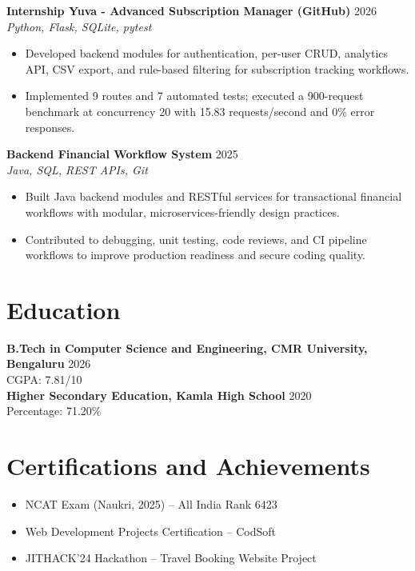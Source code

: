 \documentclass[10pt]{article}
\newcommand{\resheading}[1]{\section*{#1}}
\newcommand{\resitem}[1]{\item #1}
\newcommand{\resproject}[3]{\textbf{#1} \hfill #2\\\textit{#3}}
\begin{document}
\resproject{Internship Yuva - Advanced Subscription Manager (GitHub)}{2026}{Python, Flask, SQLite, pytest}
\begin{itemize}
    \resitem{Developed backend modules for authentication, per-user CRUD, analytics API, CSV export, and rule-based filtering for subscription tracking workflows.}
    \resitem{Implemented 9 routes and 7 automated tests; executed a 900-request benchmark at concurrency 20 with 15.83 requests/second and 0\% error responses.}
\end{itemize}

\resproject{Backend Financial Workflow System}{2025}{Java, SQL, REST APIs, Git}
\begin{itemize}
    \resitem{Built Java backend modules and RESTful services for transactional financial workflows with modular, microservices-friendly design practices.}
    \resitem{Contributed to debugging, unit testing, code reviews, and CI pipeline workflows to improve production readiness and secure coding quality.}
\end{itemize}

\resheading{Education}
\textbf{B.Tech in Computer Science and Engineering, CMR University, Bengaluru} \hfill 2026\\
CGPA: 7.81/10\\
\textbf{Higher Secondary Education, Kamla High School} \hfill 2020\\
Percentage: 71.20\%

\resheading{Certifications and Achievements}
\begin{itemize}
    \resitem{NCAT Exam (Naukri, 2025) -- All India Rank 6423}
    \resitem{Web Development Projects Certification -- CodSoft}
    \resitem{JITHACK'24 Hackathon -- Travel Booking Website Project}
\end{itemize}
\end{document}
